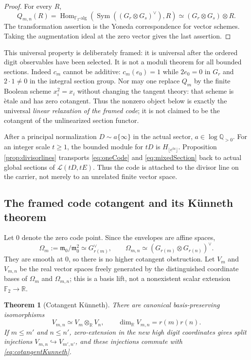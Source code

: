 \documentclass[11pt]{amsart}
\newtheorem{theorem}{Theorem}[section]
\theoremstyle{definition}
\theoremstyle{remark}
\newcommand{\R}{\mathbb R}
\newcommand{\Q}{\mathbb Q}
\begin{document}
\begin{proof}
For every $R$,
\[
 Q_{m,n}(R)=\operatorname{Hom}_{\mathbb F_2\text{-alg}}
 (\operatorname{Sym}((G_r\otimes G_s)^\vee),R)
 \simeq(G_r\otimes G_s)\otimes R.
\]
The transformation assertion is the Yoneda correspondence for vector
schemes.  Taking the augmentation ideal at the zero vector gives the last
assertion.
\end{proof}

This universal property is deliberately framed: it is universal after the
ordered digit observables have been selected.  It is not a moduli theorem
for all bounded sections.  Indeed $c_m$ cannot be additive:
$c_m(e_0)=1$ while $2e_0=0$ in $G_r$ and $2\cdot1\ne0$ in the integral
section group.  Nor may one replace $Q_m$ by the finite Boolean scheme
$x_i^2=x_i$ without changing the tangent theory: that scheme is \`etale and
has zero cotangent.  Thus the nonzero object below is exactly the universal
\emph{linear relaxation of the framed code}; it is not claimed to be the
cotangent of the unlinearized section functor.

After a principal normalization $D\sim a\{\infty\}$ in the actual sector,
$a\in\log\Q_{>0}$.  For an integer scale $t\geq1$, the bounded module for
$tD$ is $H_{\lfloor e^{ta}\rfloor}$.  Proposition
\ref{prop:divisorlines} transports \eqref{eq:oneCode} and
\eqref{eq:mixedSection} back to actual global sections of
$\mathcal L(tD,tE)$.  Thus the code is attached to the divisor line on the
carrier, not merely to an unrelated finite vector space.

\subsection{The framed code cotangent and its K\"unneth theorem}

Let $0$ denote the zero code point.  Since the envelopes are affine spaces,
\begin{equation}\label{eq:cotangentSpaces}
 \Omega_m:=\mathfrak m_0/\mathfrak m_0^2\simeq G_{r(m)}^\vee,
 \qquad
 \Omega_{m,n}\simeq(G_{r(m)}\otimes G_{r(n)})^\vee.
\end{equation}
They are smooth at $0$, so there is no higher cotangent obstruction.  Let
$V_m$ and $V_{m,n}$ be the real vector spaces freely generated by the
distinguished coordinate bases of $\Omega_m$ and $\Omega_{m,n}$;
this is a basis lift, not a nonexistent scalar extension
$\mathbb F_2\to\R$.

\begin{theorem}[Cotangent K\"unneth]\label{thm:cotangentKunneth}
There are canonical basis-preserving isomorphisms
\begin{equation}\label{eq:cotangentKunneth}
 V_{m,n}\simeq V_m\otimes_{\R}V_n,
 \qquad
 \dim_{\R}V_{m,n}=r(m)r(n).
\end{equation}
If $m\leq m'$ and $n\leq n'$, zero-extension in the new high digit
coordinates gives split injections $V_{m,n}\hookrightarrow V_{m',n'}$,
and these injections commute with \eqref{eq:cotangentKunneth}.
\end{theorem}
\end{document}
